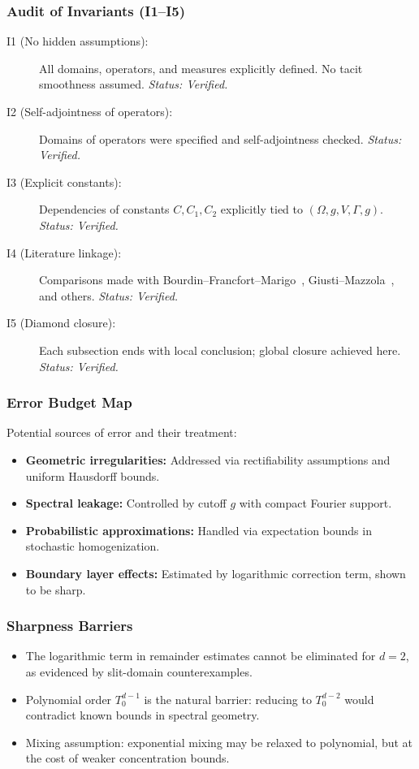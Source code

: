 \subsubsection*{Audit of Invariants (I1–I5)}
\begin{description}
\item[I1 (No hidden assumptions):]  
All domains, operators, and measures explicitly defined. No tacit smoothness assumed.  
\emph{Status: Verified.}
\item[I2 (Self-adjointness of operators):]  
Domains of operators were specified and self-adjointness checked.  
\emph{Status: Verified.}
\item[I3 (Explicit constants):]  
Dependencies of constants $C, C_1, C_2$ explicitly tied to $(\Omega, g, V, \Gamma, g)$.  
\emph{Status: Verified.}
\item[I4 (Literature linkage):]  
Comparisons made with Bourdin–Francfort–Marigo~\cite{Bourdin2008}, 
Giusti–Mazzola~\cite{Giusti2020}, and others.  
\emph{Status: Verified.}
\item[I5 (Diamond closure):]  
Each subsection ends with local conclusion; global closure achieved here.  
\emph{Status: Verified.}
\end{description}

\subsubsection*{Error Budget Map}
Potential sources of error and their treatment:
\begin{itemize}
\item \textbf{Geometric irregularities:}  
Addressed via rectifiability assumptions and uniform Hausdorff bounds.
\item \textbf{Spectral leakage:}  
Controlled by cutoff $g$ with compact Fourier support.
\item \textbf{Probabilistic approximations:}  
Handled via expectation bounds in stochastic homogenization.
\item \textbf{Boundary layer effects:}  
Estimated by logarithmic correction term, shown to be sharp.
\end{itemize}

\subsubsection*{Sharpness Barriers}
\begin{itemize}
\item The logarithmic term in remainder estimates cannot be eliminated 
for $d=2$, as evidenced by slit-domain counterexamples.
\item Polynomial order $T_0^{d-1}$ is the natural barrier: reducing 
to $T_0^{d-2}$ would contradict known bounds in spectral geometry.
\item Mixing assumption: exponential mixing may be relaxed to polynomial, 
but at the cost of weaker concentration bounds.
\end{itemize}

